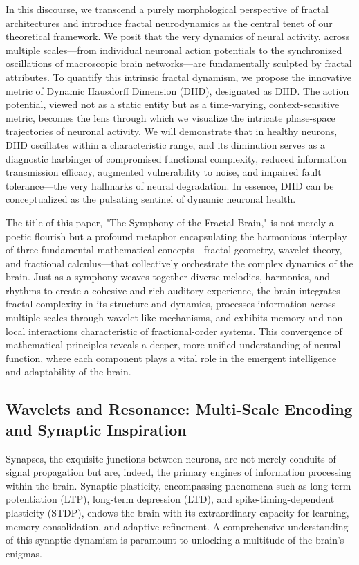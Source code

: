 \documentclass{article}
\begin{document}
In this discourse, we transcend a purely morphological perspective of fractal architectures and introduce fractal neurodynamics as the central tenet of our theoretical framework. We posit that the very dynamics of neural activity, across multiple scales—from individual neuronal action potentials to the synchronized oscillations of macroscopic brain networks—are fundamentally sculpted by fractal attributes. To quantify this intrinsic fractal dynamism, we propose the innovative metric of Dynamic Hausdorff Dimension (DHD), designated as DHD. The action potential, viewed not as a static entity but as a time-varying, context-sensitive metric, becomes the lens through which we visualize the intricate phase-space trajectories of neuronal activity. We will demonstrate that in healthy neurons, DHD oscillates within a characteristic range, and its diminution serves as a diagnostic harbinger of compromised functional complexity, reduced information transmission efficacy, augmented vulnerability to noise, and impaired fault tolerance—the very hallmarks of neural degradation. In essence, DHD can be conceptualized as the pulsating sentinel of dynamic neuronal health.

The title of this paper, "The Symphony of the Fractal Brain," is not merely a poetic flourish but a profound metaphor encapsulating the harmonious interplay of three fundamental mathematical concepts—fractal geometry, wavelet theory, and fractional calculus—that collectively orchestrate the complex dynamics of the brain. Just as a symphony weaves together diverse melodies, harmonies, and rhythms to create a cohesive and rich auditory experience, the brain integrates fractal complexity in its structure and dynamics, processes information across multiple scales through wavelet-like mechanisms, and exhibits memory and non-local interactions characteristic of fractional-order systems. This convergence of mathematical principles reveals a deeper, more unified understanding of neural function, where each component plays a vital role in the emergent intelligence and adaptability of the brain.

\subsection{Wavelets and Resonance: Multi-Scale Encoding and Synaptic Inspiration}

Synapses, the exquisite junctions between neurons, are not merely conduits of signal propagation but are, indeed, the primary engines of information processing within the brain. Synaptic plasticity, encompassing phenomena such as long-term potentiation (LTP), long-term depression (LTD), and spike-timing-dependent plasticity (STDP), endows the brain with its extraordinary capacity for learning, memory consolidation, and adaptive refinement. A comprehensive understanding of this synaptic dynamism is paramount to unlocking a multitude of the brain’s enigmas.
\end{document}
